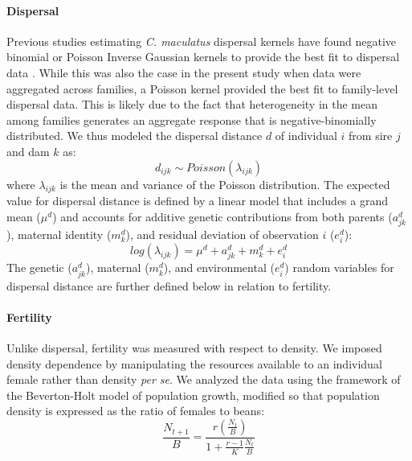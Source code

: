 \documentclass[11pt]{article}
\begin{document}
\paragraph{Dispersal}
Previous studies estimating \textit{C. maculatus} dispersal kernels have found negative binomial or Poisson Inverse Gaussian kernels to provide the best fit to dispersal data \citep{miller_sex_2013,wagner2017genetic,ochocki_rapid_2017}.
While this was also the case in the present study when data were aggregated across families, a Poisson kernel provided the best fit to family-level dispersal data.
This is likely due to the fact that heterogeneity in the mean among families generates an aggregate response that is negative-binomially distributed.
We thus modeled the dispersal distance $d$ of individual $i$ from sire $j$ and dam $k$ as:
%
\begin{equation}\label{corr:dispersal_random}
  d_{ijk} \sim \mathit{Poisson}(\lambda_{ijk})
\end{equation}
%
where $\lambda_{ijk}$ is the mean and variance of the Poisson distribution.
The expected value for dispersal distance is defined by a linear model that includes a grand mean ($\mu^{d}$) and accounts for additive genetic contributions from both parents ($a^{d}_{jk}$), maternal identity ($m^{d}_{k}$), and residual deviation of observation $i$ ($e^{d}_i$):
%
\begin{equation} \label{corr:dispersal_linmod}
  log(\lambda_{ijk}) = \mu^{d} + a^{d}_{jk} + m^{d}_{k} + e^{d}_{i}
\end{equation}
%
The genetic ($a^{d}_{jk}$), maternal ($m^{d}_{k}$), and environmental ($e^{d}_i$) random variables for dispersal distance are further defined below in relation to fertility.


\paragraph{Fertility}
Unlike dispersal, fertility was measured with respect to density.
We imposed density dependence by manipulating the resources available to an individual female rather than density \textit{per se}.
We analyzed the data using the framework of the Beverton-Holt model of population growth, modified so that population density is expressed as the ratio of females to beans:
%
\begin{equation}\label{corr:BevHoltFull}
  \frac{N_{t+1}}{B} = \frac{r(\frac{N_{t}}{B})}{1 + \frac{r-1}{K}\frac{N_{t}}{B}}
\end{equation}
%
\end{document}
